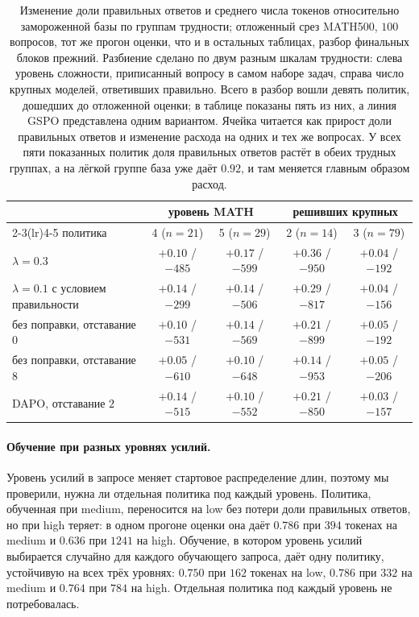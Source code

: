 \documentclass[11pt]{article}
\begin{document}
\begin{table}[t]
\centering
\begin{tabular}{lcccc}
\toprule
 & \multicolumn{2}{c}{уровень MATH} & \multicolumn{2}{c}{решивших крупных} \\
\cmidrule(lr){2-3}\cmidrule(lr){4-5}
политика & 4 ($n{=}21$) & 5 ($n{=}29$) & 2 ($n{=}14$) & 3 ($n{=}79$) \\
\midrule
$\lambda{=}0.3$ & $+0.10$ / $-485$ & $+0.17$ / $-599$ & $+0.36$ / $-950$  & $+0.04$ / $-192$ \\
$\lambda{=}0.1$ с условием правильности & $+0.14$ / $-299$ & $+0.14$ / $-506$ & $+0.29$ / $-817$  & $+0.04$ / $-156$ \\
без поправки, отставание $0$ & $+0.10$ / $-531$ & $+0.14$ / $-569$ & $+0.21$ / $-899$  & $+0.05$ / $-192$ \\
без поправки, отставание $8$ & $+0.05$ / $-610$ & $+0.10$ / $-648$ & $+0.14$ / $-953$  & $+0.05$ / $-206$ \\
DAPO, отставание $2$ & $+0.14$ / $-515$ & $+0.10$ / $-552$ & $+0.21$ / $-850$  & $+0.03$ / $-157$ \\
\bottomrule
\end{tabular}
\caption{Изменение доли правильных ответов и среднего числа токенов относительно замороженной базы по группам трудности; отложенный срез MATH500, $100$ вопросов, тот же прогон оценки, что и в остальных таблицах, разбор финальных блоков прежний. Разбиение сделано по двум разным шкалам трудности: слева уровень сложности, приписанный вопросу в самом наборе задач, справа число крупных моделей, ответивших правильно. Всего в разбор вошли девять политик, дошедших до отложенной оценки; в таблице показаны пять из них, а линия GSPO представлена одним вариантом. Ячейка читается как прирост доли правильных ответов и изменение расхода на одних и тех же вопросах. У всех пяти показанных политик доля правильных ответов растёт в обеих трудных группах, а на лёгкой группе база уже даёт $0.92$, и там меняется главным образом расход.}
\label{tab:difficulty}
\end{table}

\paragraph{Обучение при разных уровнях усилий.} Уровень усилий в запросе меняет стартовое распределение длин, поэтому мы проверили, нужна ли отдельная политика под каждый уровень. Политика, обученная при medium, переносится на low без потери доли правильных ответов, но при high теряет: в одном прогоне оценки она даёт $0.786$ при $394$ токенах на medium и $0.636$ при $1241$ на high. Обучение, в котором уровень усилий выбирается случайно для каждого обучающего запроса, даёт одну политику, устойчивую на всех трёх уровнях: $0.750$ при $162$ токенах на low, $0.786$ при $332$ на medium и $0.764$ при $784$ на high. Отдельная политика под каждый уровень не потребовалась.
\end{document}
